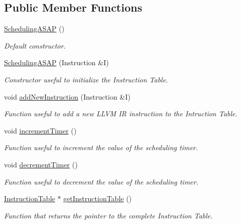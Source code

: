 \subsection*{Public Member Functions}
\begin{DoxyCompactItemize}
\item 
\hyperlink{classoctantis_1_1SchedulingASAP_a6354db3834d5a1946a9d7fc61f83ac69}{Scheduling\+A\+S\+AP} ()
\begin{DoxyCompactList}\small\item\em Default constructor. \end{DoxyCompactList}\item 
\hyperlink{classoctantis_1_1SchedulingASAP_a8a6fee824cdf5a0a8cde0e98007ff991}{Scheduling\+A\+S\+AP} (Instruction \&I)
\begin{DoxyCompactList}\small\item\em Constructor useful to initialize the Instruction Table. \end{DoxyCompactList}\item 
void \hyperlink{classoctantis_1_1SchedulingASAP_ae901ec5f1113be04c9c28ab0f796c166}{add\+New\+Instruction} (Instruction \&I)
\begin{DoxyCompactList}\small\item\em Function useful to add a new L\+L\+VM IR instruction to the Intruction Table. \end{DoxyCompactList}\item 
void \hyperlink{classoctantis_1_1SchedulingASAP_a8b0a9d978d7b4276b1c741779a5e4191}{increment\+Timer} ()
\begin{DoxyCompactList}\small\item\em Function useful to increment the value of the scheduling timer. \end{DoxyCompactList}\item 
void \hyperlink{classoctantis_1_1SchedulingASAP_a32cbd30ee5e9591898edf498c03ddfaf}{decrement\+Timer} ()
\begin{DoxyCompactList}\small\item\em Function useful to decrement the value of the scheduling timer. \end{DoxyCompactList}\item 
\hyperlink{classoctantis_1_1InstructionTable}{Instruction\+Table} $\ast$ \hyperlink{classoctantis_1_1SchedulingASAP_a2aae2d1a8c0482012ac781faf0a7fd42}{get\+Instruction\+Table} ()
\begin{DoxyCompactList}\small\item\em Function that returns the pointer to the complete Instruction Table. \end{DoxyCompactList}\item 

\end{DoxyCompactItemize}
